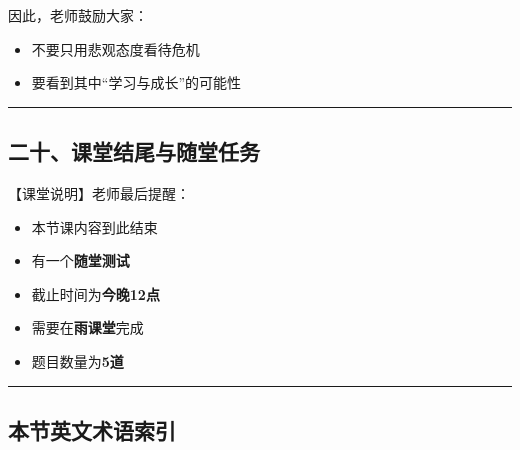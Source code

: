 \documentclass[
  chinese,
  9pt,
  a4paper,
]{ctexart}
\providecommand{\tightlist}{%
  \setlength{\itemsep}{0pt}\setlength{\parskip}{0pt}}
\begin{document}
因此，老师鼓励大家：

\begin{itemize}
\tightlist
\item
  不要只用悲观态度看待危机
\item
  要看到其中``学习与成长''的可能性
\end{itemize}

\begin{center}\rule{0.5\linewidth}{0.5pt}\end{center}

\subsection{二十、课堂结尾与随堂任务}\label{ux4e8cux5341ux8bfeux5802ux7ed3ux5c3eux4e0eux968fux5802ux4efbux52a1}

【课堂说明】老师最后提醒：

\begin{itemize}
\tightlist
\item
  本节课内容到此结束
\item
  有一个\textbf{随堂测试}
\item
  截止时间为\textbf{今晚12点}
\item
  需要在\textbf{雨课堂}完成
\item
  题目数量为\textbf{5道}
\end{itemize}

\begin{center}\rule{0.5\linewidth}{0.5pt}\end{center}

\subsection{本节英文术语索引}\label{ux672cux8282ux82f1ux6587ux672fux8bedux7d22ux5f15-4}
\end{document}
